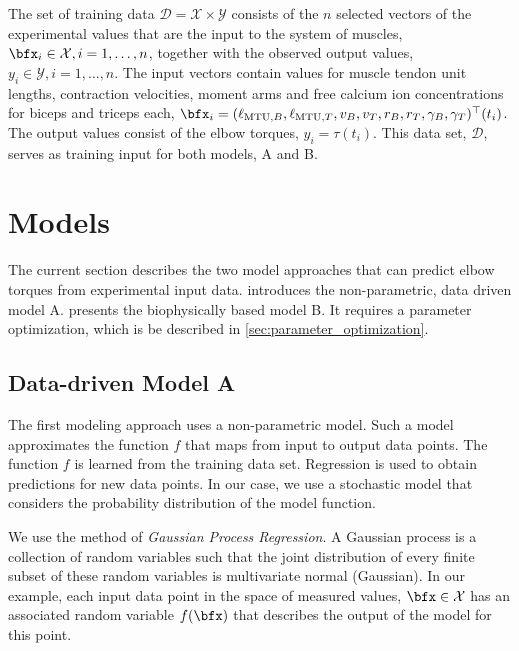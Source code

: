 The set of training data $\mathcal{D} = \mathcal{X} \times \mathcal{Y}$ consists of the $n$ selected vectors of the experimental values that are the input to the system of muscles, $\bfx_i \in \mathcal{X}, i=1,\dots, n$, together with the observed output values, $y_i \in \mathcal{Y}, i=1,\dots,n$.
The input vectors contain values for muscle tendon unit lengths, contraction velocities, moment arms and free calcium ion concentrations for biceps and triceps each, $\bfx_i = (\ell_{\text{MTU},B}, \ell_{\text{MTU},T}, v_B, v_T, r_{B}, r_{T}, \gamma_B, \gamma_T)^\top(t_i)$. The output values consist of the elbow torques, $y_i = \tau(t_i)$. This data set, $\mathcal{D}$, serves as training input for both models, A and B.

\section{Models}\label{sec:study_models}

The current section describes the two model approaches that can predict elbow torques from experimental input data.  introduces the non-parametric, data driven model A.  presents the biophysically based model B. It requires a parameter optimization, which is be described in \cref{sec:parameter_optimization}.

\subsection{Data-driven Model A}\label{sec:data_driven_model}

The first modeling approach uses a non-parametric model. Such a model approximates the function $f$ that maps from input to output data points. The function $f$ is learned from the training data set. Regression is used to obtain predictions for new data points. In our case, we use a stochastic model that considers the probability distribution of the model function.

We use the method of \emph{Gaussian Process Regression}. A Gaussian process is a collection of random variables such that the joint distribution of every finite subset of these random variables is multivariate normal (Gaussian).
In our example, each input data point in the space of measured values, $\bfx \in \mathcal{X}$ has an associated random variable $f(\bfx)$ that describes the output of the model for this point.

